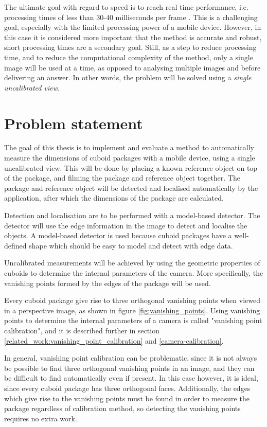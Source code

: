 The ultimate goal with regard to speed is to reach real time performance, i.e. processing times of less than 30-40 milliseconds per frame \cite{pulli2012real}.
This is a challenging goal, especially with the limited processing power of a mobile device.
However, in this case it is considered more important that the method is accurate and robust, short processing times are a secondary goal.
Still, as a step to reduce processing time, and to reduce the computational complexity of the method, only a single image will be used at a time, as opposed to analysing multiple images and before delivering an answer.
In other words, the problem will be solved using a \textit{single uncalibrated view}.

\section{Problem statement}\label{problem-statement}
The goal of this thesis is to implement and evaluate a method to automatically measure the dimensions of cuboid packages with a mobile device, using a single uncalibrated view.
This will be done by placing a known reference object on top of the package, and filming the package and reference object together.
The package and reference object will be detected and localised automatically by the application, after which the dimensions of the package are calculated.

Detection and localisation are to be performed with a model-based detector.
The detector will use the edge information in the image to detect and localise the objects.
A model-based detector is used because cuboid packages have a well-defined shape which should be easy to model and detect with edge data.

Uncalibrated measurements will be achieved by using the geometric properties of cuboids to determine the internal parameters of the camera. More specifically, the vanishing points formed by the edges of the package will be used.

Every cuboid package give rise to three orthogonal vanishing points when viewed in a perspective image, as shown in figure \ref{fig:vanishing_points}.
Using vanishing points to determine the internal parameters of a camera is called "vanishing point calibration", and it is described further in section \ref{related_work:vanishing_point_calibration} and \ref{camera-calibration}.

In general, vanishing point calibration can be problematic, since it is not always be possible to find three orthogonal vanishing points in an image, and they can be difficult to find automatically even if present.
In this case however, it is ideal, since every cuboid package has three orthogonal faces.
Additionally, the edges which give rise to the vanishing points must be found in order to measure the package regardless of calibration method, so detecting the vanishing points requires no extra work.

